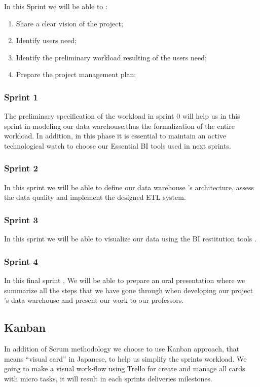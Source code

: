 \documentclass[12pt]{article}
\begin{document}
In this Sprint we will be able to  :
\begin{enumerate}
\item Share a clear vision of the project;
\item Identify users need;
\item Identify the preliminary workload resulting of the users need;
\item Prepare the project management plan;
\end{enumerate}
 
\subsubsection{Sprint 1}
The preliminary specification of the workload  in sprint 0
will help us in this sprint in modeling our data warehouse,thus the formalization of the entire workload.
In addition, in this phase it is essential to maintain an active technological watch to choose our Essential BI tools
used in  next sprints.
\subsubsection{Sprint 2}
In this sprint we will be able to define our data warehouse 's architecture, assess the  data quality and implement the designed ETL system.
\subsubsection{Sprint 3}
In this sprint we will be able to visualize our data using the BI restitution tools .
\subsubsection{Sprint 4}
In this final sprint , We will be able to prepare an oral
presentation where we summarize all the steps that we have gone through when developing our project 's data warehouse and present 
our work to our professors.

\subsection{Kanban}

In addition of Scrum methodology we choose to use Kanban approach, that means “visual card” in Japanese, to help us simplify the sprints workload. We going to make a visual work-flow using Trello for create and manage all cards with micro tasks, it will result in each sprints deliveries milestones. 
\end{document}
